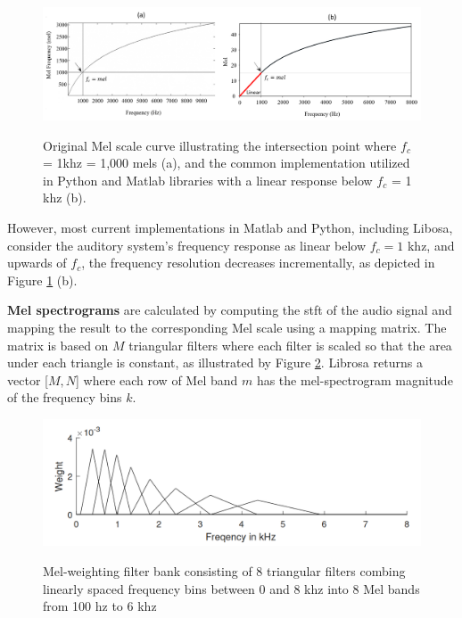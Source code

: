 \begin{figure}[htbp]
    \raggedright
        \caption{Original Mel scale curve illustrating the intersection point where $f_c$ = 1\gls{k}\gls{hz} = 1,000 mels (a), and the common implementation utilized in Python and Matlab libraries with a linear response below $f_c$ = 1 \gls{k}\gls{hz} (b).}
        \includegraphics[width=1\textwidth]{resources/images/030-theoretical_framework/Framework_spectral_features_log-mel_scale.png}
        \label{fig:frmwk_spectral_features_mel_scale}
\end{figure}

However, most current implementations in Matlab and Python, including Libosa, consider the auditory system’s frequency response as linear below $f_c = 1$ \gls{k}\gls{hz}, and upwards of $f_c$, the frequency resolution decreases incrementally, as depicted in Figure \ref{fig:frmwk_spectral_features_mel_scale} (b). 

\textbf{Mel spectrograms} are calculated by computing the \gls{stft} of the audio signal and mapping the result to the corresponding Mel scale using a mapping matrix. The matrix is based on $M$ triangular filters where each filter is scaled so that the area under each triangle is constant, as illustrated by Figure \ref{fig:frmwk_spectral_features_mel_filter_bank}. Librosa \cite{McFee2015librosa_sw} returns a vector [$M, N$] where each row of Mel band $m$ has the mel-spectrogram magnitude of the frequency bins $k$.

\begin{figure}[htbp]
    \raggedright
        \caption{Mel-weighting filter bank consisting of 8 triangular filters combing linearly spaced frequency bins between 0 and 8 \gls{k}\gls{hz} into 8 Mel bands from 100 \gls{hz} to 6 \gls{k}\gls{hz}}
        \includegraphics[width=.75\textwidth]{resources/images/030-theoretical_framework/Framework_spectral_features_log-mel_filter_bank.png}
        \label{fig:frmwk_spectral_features_mel_filter_bank}
\end{figure}

